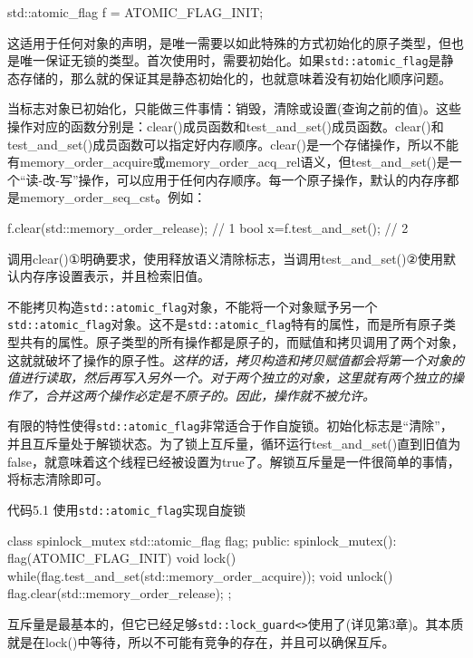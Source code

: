 \begin{cpp}
std::atomic_flag f = ATOMIC_FLAG_INIT;
\end{cpp}

这适用于任何对象的声明，是唯一需要以如此特殊的方式初始化的原子类型，但也是唯一保证无锁的类型。首次使用时，需要初始化。如果\texttt{std::atomic\_flag}是静态存储的，那么就的保证其是静态初始化的，也就意味着没有初始化顺序问题。

当标志对象已初始化，只能做三件事情：销毁，清除或设置(查询之前的值)。这些操作对应的函数分别是：clear()成员函数和test\_and\_set()成员函数。clear()和test\_and\_set()成员函数可以指定好内存顺序。clear()是一个存储操作，所以不能有memory\_order\_acquire或memory\_order\_acq\_rel语义，但test\_and\_set()是一个“读-改-写”操作，可以应用于任何内存顺序。每一个原子操作，默认的内存序都是memory\_order\_seq\_cst。例如：

\begin{cpp}
f.clear(std::memory_order_release);  // 1
bool x=f.test_and_set();  // 2
\end{cpp}

调用clear()①明确要求，使用释放语义清除标志，当调用test\_and\_set()②使用默认内存序设置表示，并且检索旧值。

不能拷贝构造\texttt{std::atomic\_flag}对象，不能将一个对象赋予另一个\texttt{std::atomic\_flag}对象。这不是\texttt{std::atomic\_flag}特有的属性，而是所有原子类型共有的属性。原子类型的所有操作都是原子的，而赋值和拷贝调用了两个对象，这就就破坏了操作的原子性。\textit{这样的话，拷贝构造和拷贝赋值都会将第一个对象的值进行读取，然后再写入另外一个。对于两个独立的对象，这里就有两个独立的操作了，合并这两个操作必定是不原子的。因此，操作就不被允许。}

有限的特性使得\texttt{std::atomic\_flag}非常适合于作自旋锁。初始化标志是“清除”，并且互斥量处于解锁状态。为了锁上互斥量，循环运行test\_and\_set()直到旧值为false，就意味着这个线程已经被设置为true了。解锁互斥量是一件很简单的事情，将标志清除即可。

代码5.1 使用\texttt{std::atomic\_flag}实现自旋锁

\begin{cpp}
class spinlock_mutex
{
  std::atomic_flag flag;
public:
  spinlock_mutex():
    flag(ATOMIC_FLAG_INIT)
  {}
  void lock()
  {
    while(flag.test_and_set(std::memory_order_acquire));
  }
  void unlock()
  {
    flag.clear(std::memory_order_release);
  }
};
\end{cpp}

互斥量是最基本的，但它已经足够\texttt{std::lock\_guard<>}使用了(详见第3章)。其本质就是在lock()中等待，所以不可能有竞争的存在，并且可以确保互斥。

